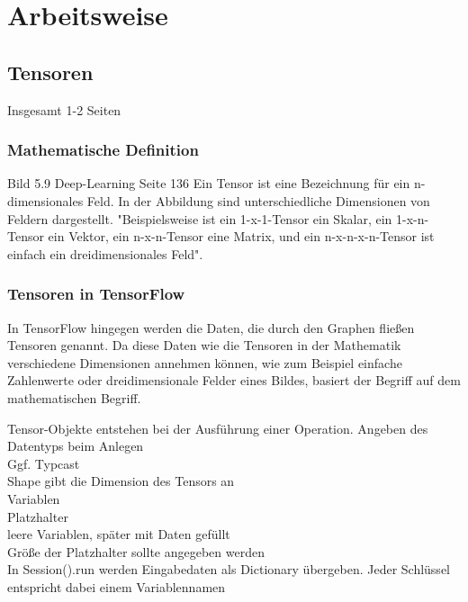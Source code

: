 \chapter{Arbeitsweise}
\label{chap:arbeitsweise}
\section{Tensoren}
\label{sec:tensoren}
\printsubchapterauthor{\authorNiklas}
Insgesamt 1-2 Seiten

\subsection{Mathematische Definition}
\label{sec:mathematischeDefinition}
Bild 5.9 Deep-Learning Seite 136
Ein Tensor ist eine Bezeichnung für ein n-dimensionales Feld. In der Abbildung sind unterschiedliche Dimensionen von Feldern dargestellt. "Beispielsweise ist ein 1-x-1-Tensor ein Skalar, ein 1-x-n-Tensor ein Vektor, ein n-x-n-Tensor eine Matrix, und ein n-x-n-x-n-Tensor ist einfach ein dreidimensionales Feld"\citep{Einfuehrung}.

\subsection{Tensoren in TensorFlow}
\label{sec:tensorenInTensorflow}
In TensorFlow hingegen werden die Daten, die durch den Graphen fließen Tensoren genannt. Da diese Daten wie die Tensoren in der Mathematik verschiedene Dimensionen annehmen können, wie zum Beispiel einfache Zahlenwerte oder dreidimensionale Felder eines Bildes, basiert der Begriff auf dem mathematischen Begriff.

Tensor-Objekte entstehen bei der Ausführung einer Operation. 
Angeben des Datentyps beim Anlegen\\
Ggf. Typcast\\
Shape gibt die Dimension des Tensors an\\


Variablen\\


Platzhalter\\
leere Variablen, später mit Daten gefüllt\\
Größe der Platzhalter sollte angegeben werden\\
In Session().run werden Eingabedaten als Dictionary übergeben. Jeder Schlüssel entspricht dabei einem Variablennamen\\

